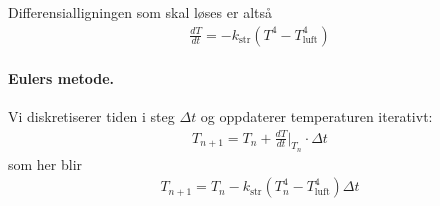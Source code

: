 Differensialligningen som skal løses er alts\aa{}
\begin{align}
\frac{dT}{dt} = -k_\text{str}\left(T^4 - T_\text{luft}^4\right)
\end{align}

\paragraph{Eulers metode.}
Vi diskretiserer tiden i steg $\Delta t$ og oppdaterer temperaturen iterativt:
\begin{align}
T_{n+1} = T_n + \frac{dT}{dt}\bigg|_{T_n} \cdot \Delta t
\end{align}
som her blir
\begin{align}
T_{n+1} = T_n - k_\text{str}\left(T_n^4 - T_\text{luft}^4\right)\Delta t
\end{align}

\begin{figure}[H]
\centering

\caption{}
\end{figure}

\newpage




\newpage